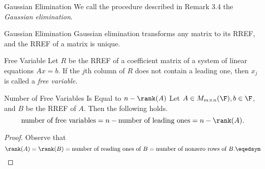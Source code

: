 \documentclass[linearalgebra]{subfiles}
\begin{document}
    \begin{definition}{Gaussian Elimination}{}
        We call the procedure described in Remark 3.4 the \emph{Gaussian elimination}.
    \end{definition}

    \begin{prop}{Gaussian Elimination}
        Gaussian elimination transforms any matrix to its RREF, and the RREF of a matrix is unique.
    \end{prop}

    \begin{definition}{Free Variable}{}
        Let $R$ be the RREF of a coefficient matrix of a system of linear equations $Ax=b$. If the $j$th column of $R$ does not contain a leading one, then $x_j$ is called a \emph{free variable}.
    \end{definition}

    \begin{prop}{Number of Free Variables Is Equal to $n-\rank(A)$}
        Let $A\in M_{m\times n}(\F), b\in \F$, and $B$ be the RREF of $A$. Then the following holds.
        \begin{equation*}
            \text{number of free variables} = n - \text{number of leading ones} = n - \rank(A). 
        \end{equation*}
    \end{prop}

    \begin{proof}
        Observe that
        \begin{equation*} 
            \rank(A) = \rank(B) = \text{number of reading ones of } B = \text{number of nonzero rows of } B. \eqedsym 
        \end{equation*}
    \end{proof}
\end{document}
